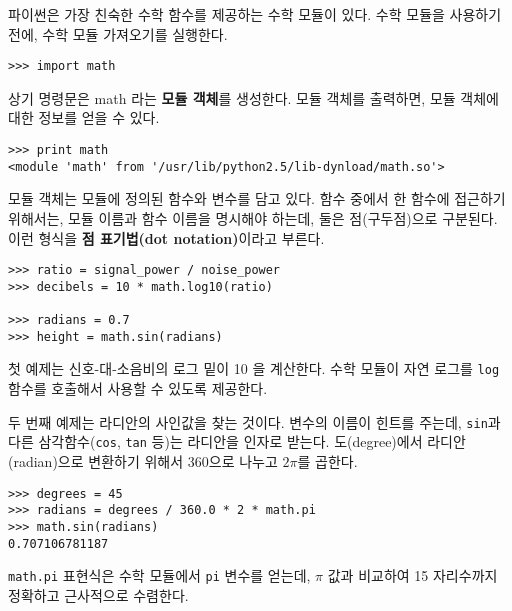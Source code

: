 파이썬은 가장 친숙한 수학 함수를 제공하는 수학 모듈이 있다.
수학 모듈을 사용하기 전에, 수학 모듈 가져오기를 실행한다.

\beforeverb
\begin{verbatim}
>>> import math
\end{verbatim}
\afterverb
%

상기 명령문은 math 라는 {\bf 모듈 객체}를 생성한다. 
모듈 객체를 출력하면, 모듈 객체에 대한 정보를 얻을 수 있다.

\beforeverb
\begin{verbatim}
>>> print math
<module 'math' from '/usr/lib/python2.5/lib-dynload/math.so'>
\end{verbatim}
\afterverb
%

모듈 객체는 모듈에 정의된 함수와 변수를 담고 있다. 
함수 중에서 한 함수에 접근하기 위해서는, 모듈 이름과 함수 이름을 명시해야 하는데, 둘은 점(구두점)으로 구분된다.
이런 형식을 {\bf 점 표기법(dot notation)}이라고 부른다.


\beforeverb
\begin{verbatim}
>>> ratio = signal_power / noise_power
>>> decibels = 10 * math.log10(ratio)

>>> radians = 0.7
>>> height = math.sin(radians)
\end{verbatim}
\afterverb
%

첫 예제는 신호-대-소음비의 로그 밑이 10 을 계산한다.
수학 모듈이 자연 로그를 {\tt log} 함수를 호출해서 사용할 수 있도록 제공한다.


두 번째 예제는 라디안의 사인값을 찾는 것이다. 
변수의 이름이 힌트를 주는데, {\tt sin}과 다른 삼각함수({\tt cos}, {\tt tan} 등)는 라디안을 인자로 받는다.
도(degree)에서 라디안(radian)으로 변환하기 위해서 360으로 나누고 $2\pi$를 곱한다.

\beforeverb
\begin{verbatim}
>>> degrees = 45
>>> radians = degrees / 360.0 * 2 * math.pi
>>> math.sin(radians)
0.707106781187
\end{verbatim}
\afterverb
%

{\tt math.pi} 표현식은 수학 모듈에서 {\tt pi} 변수를 얻는데, $\pi$ 값과 비교하여 15 자리수까지 정확하고 근사적으로 수렴한다.

